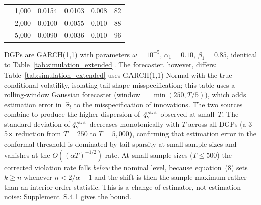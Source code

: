 \begin{table}[H]
\begin{tabular}{@{}llcccc@{}}
		& 1,000   & 0.0154 & 0.0103 & 0.008 & 82 \\
		& 2,000   & 0.0100 & 0.0055 & 0.010 & 88 \\
		& 5,000   & 0.0090 & 0.0036 & 0.010 & 96 \\
		\bottomrule
	\end{tabular}
	\begin{minipage}{\linewidth}\footnotesize
		\smallskip
		DGPs are GARCH(1,1) with parameters
		$\omega = 10^{-5}$, $\alpha_1 = 0.10$, $\beta_1 = 0.85$,
		identical to Table~\ref{tab:simulation_extended}.
		The forecaster, however, differs:
		Table~\ref{tab:simulation_extended} uses GARCH(1,1)-Normal
		with the true conditional volatility, isolating tail-shape
		misspecification; this table uses a rolling-window Gaussian
		forecaster (window $= \min(250, T/5)$), which adds estimation
		error in~$\hat\sigma_t$ to the misspecification of innovations.
		The two sources combine to produce the higher dispersion
		of~$\hat{q}_{\scriptscriptstyle\mathrm{V}}^{\,\mathrm{stat}}$ observed at small~$T$.
		The standard deviation of $\hat{q}_{\scriptscriptstyle\mathrm{V}}^{\,\mathrm{stat}}$ decreases monotonically with $T$
		across all DGPs (a 3--5$\times$ reduction from $T=250$ to $T=5{,}000$),
		confirming that estimation error in the conformal threshold is
		dominated by tail sparsity at small sample sizes and vanishes at
		the $O((\alpha T)^{-1/2})$ rate. At small sample sizes
		($T \leq 500$) the corrected violation rate falls \emph{below} the
		nominal level, because equation~(8) sets $k \ge n$ whenever
		$n < 2/\alpha - 1$ and the shift is then the sample maximum rather
		than an interior order statistic. This is a change of estimator, not
		estimation noise: Supplement~S.4.1 gives the bound.
	\end{minipage}
\end{table}